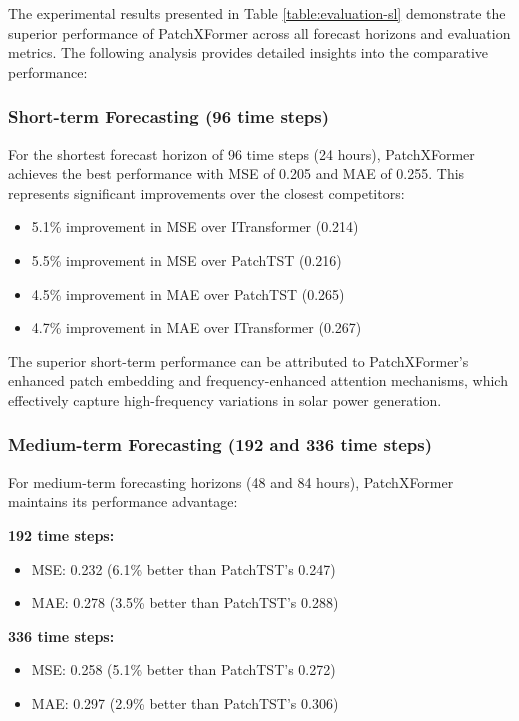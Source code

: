 \documentclass[12pt]{uomthesis}
\begin{document}
The experimental results presented in Table \ref{table:evaluation-sl} demonstrate the superior performance of PatchXFormer across all forecast horizons and evaluation metrics. The following analysis provides detailed insights into the comparative performance:

\subsubsection{Short-term Forecasting (96 time steps)}

For the shortest forecast horizon of 96 time steps (24 hours), PatchXFormer achieves the best performance with MSE of 0.205 and MAE of 0.255. This represents significant improvements over the closest competitors:
\begin{itemize}
\item 5.1\% improvement in MSE over ITransformer (0.214)
\item 5.5\% improvement in MSE over PatchTST (0.216)
\item 4.5\% improvement in MAE over PatchTST (0.265)
\item 4.7\% improvement in MAE over ITransformer (0.267)
\end{itemize}

The superior short-term performance can be attributed to PatchXFormer's enhanced patch embedding and frequency-enhanced attention mechanisms, which effectively capture high-frequency variations in solar power generation.

\subsubsection{Medium-term Forecasting (192 and 336 time steps)}

For medium-term forecasting horizons (48 and 84 hours), PatchXFormer maintains its performance advantage:

\textbf{192 time steps:}
\begin{itemize}
\item MSE: 0.232 (6.1\% better than PatchTST's 0.247)
\item MAE: 0.278 (3.5\% better than PatchTST's 0.288)
\end{itemize}

\textbf{336 time steps:}
\begin{itemize}
\item MSE: 0.258 (5.1\% better than PatchTST's 0.272)
\item MAE: 0.297 (2.9\% better than PatchTST's 0.306)
\end{itemize}
\end{document}
